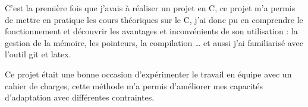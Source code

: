 	C'est la première fois que j'avais à réaliser un projet en C, ce projet m'a permis de mettre en pratique les cours théoriques sur le C, j'ai donc pu en comprendre le fonctionnement et découvrir les avantages et inconvénients de son utilisation : la gestion de la mémoire, les pointeurs, la compilation … et aussi j’ai familiarisé avec l’outil git et latex.


	Ce projet était une bonne occasion d'expérimenter le travail en équipe avec un cahier de charges, cette méthode m’a permis d’améliorer mes capacités d’adaptation avec différentes contraintes. 